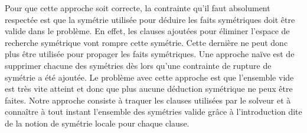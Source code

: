 Pour que cette approche soit correcte, la contrainte qu'il faut absolument respectée est que la symétrie utilisée pour déduire les
faits symétriques doit être valide dans le problème. En effet, les clauses ajoutées pour éliminer l'espace de recherche
symétrique vont rompre cette symétrie. Cette dernière ne peut donc plus être utilisée pour propager les faits symétriques.
Une approche naïve est de supprimer chacune des symétries dès lors qu'une contrainte de rupture de symétrie a été ajoutée.
Le problème avec cette approche est que l'ensemble vide est très vite atteint et donc que plus aucune déduction symétrique ne peux être faites. Notre approche consiste à traquer les clauses utilisées par le solveur et à connaître à tout instant l'ensemble des symétries valide grâce à l'introduction dite de la notion de symétrie locale pour chaque clause.

\vspace{2em}

\begin{table}[!htbp]\footnotesize
	\centering
	\caption{Comparaison des approches sur les instances SAT.}
	\label{tab:satfr}
\end{table}%


